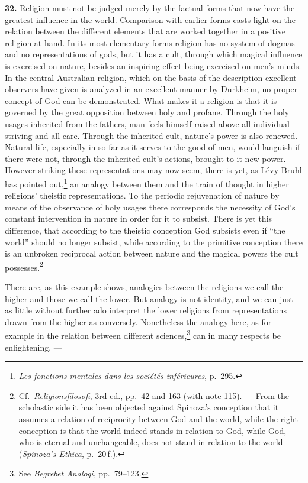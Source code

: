 \documentclass[12pt]{book}
\newcommand{\hnum}[1]{\textbf{#1.}\enspace}
\newcommand{\opage}[1]{\marginnote{\footnotesize\textit{[#1]}}}
\begin{document}
\hnum{32} Religion must not be judged merely by the factual forms that now have the greatest influence in the
world. Comparison with earlier forms casts light on the relation between the different elements that are
worked together in a positive religion at hand. In its most elementary forms religion has no system of dogmas
and no representations of gods, but it has a cult, through which magical influence is exercised on nature,
besides an inspiring effect being exercised on men's minds. In the central-Australian religion, which on the
basis of the description excellent observers have given is analyzed in an excellent manner by Durkheim, no
proper concept of God can be demonstrated. What makes it a religion is that it is governed by the great
opposition between holy and profane. Through the holy usages inherited from the fathers, man feels himself
raised above all individual striving and all care. Through the inherited cult, nature's power is also renewed.
Natural life, especially in so far as it serves to the good of men, would languish if there were not, through
the inherited cult's actions, brought to it new power. However striking these representations may now seem,
there is yet, as Lévy-Bruhl has pointed out,\footnote{\textit{Les fonctions mentales dans les sociétés
inférieures}, p.\ 295.} an analogy between them \opage{108}and the train of thought in higher religions' theistic
representations. To the periodic rejuvenation of nature by means of the observance of holy usages there
corresponds the necessity of God's constant intervention in nature in order for it to subsist. There is yet
this difference, that according to the theistic conception God subsists even if ``the world'' should no longer
subsist, while according to the primitive conception there is an unbroken reciprocal action between nature and
the magical powers the cult possesses.\footnote{Cf.\ \textit{Religionsfilosofi}, 3rd ed., pp.\ 42 and 163
(with note 115). --- From the scholastic side it has been objected against Spinoza's conception that it
assumes a relation of reciprocity between God and the world, while the right conception is that the world
indeed stands in relation to God, while God, who is eternal and unchangeable, does not stand in relation to
the world (\textit{Spinoza's Ethica}, p.\ 20\,f.).}

There are, as this example shows, analogies between the religions we call the higher and those we call the
lower. But analogy is not identity, and we can just as little without further ado interpret the lower
religions from representations drawn from the higher as conversely. Nonetheless the analogy here, as for
example in the relation between different sciences,\footnote{See \textit{Begrebet Analogi}, pp.\ 79--123.} can
in many respects be enlightening. ---
\end{document}
